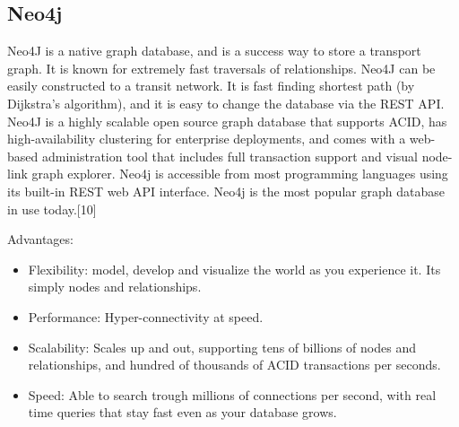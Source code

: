 \subsection{Neo4j}
Neo4J \citep{website:neo4j} is a native graph database, and is a success way to store a transport graph. It is known for extremely fast traversals of relationships. Neo4J can be easily constructed to a transit network. It is fast finding shortest path (by Dijkstra's algorithm), and it is easy to change the database via the REST API. 
Neo4J is a highly scalable open source graph database that supports ACID, has high-availability clustering for enterprise deployments, and comes with a web-based administration tool that includes full transaction support and visual node-link graph explorer. Neo4j is accessible from most programming languages using its built-in REST web API interface. Neo4j is the most popular graph database in use today.[10]

Advantages:
\begin{itemize} 
\item Flexibility: model, develop and visualize the world as you experience it. Its simply nodes and relationships. 
\item Performance: Hyper-connectivity at speed. 
\item Scalability: Scales up and out, supporting tens of billions of nodes and relationships, and hundred of thousands of ACID transactions per seconds. 
\item Speed: Able to search trough millions of connections per second, with real time queries that stay fast even as your database grows. 
\end{itemize}



